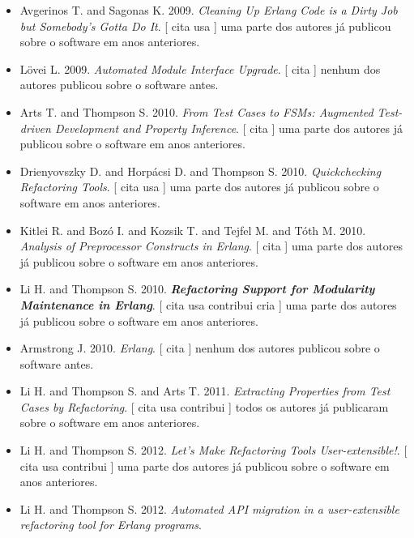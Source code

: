\begin{itemize}
\item Avgerinos T. and Sagonas K.
      2009.
        \textit{ Cleaning Up Erlang Code is a Dirty Job but Somebody's Gotta Do It}.
      [
          cita
          usa
      ]
uma parte dos autores já publicou sobre o software em anos anteriores.
\item L\"{o}vei L.
      2009.
        \textit{ Automated Module Interface Upgrade}.
      [
          cita
      ]
nenhum dos autores publicou sobre o software antes.
\item Arts T. and Thompson S.
      2010.
        \textit{ From Test Cases to FSMs: Augmented Test-driven Development and Property Inference}.
      [
          cita
      ]
uma parte dos autores já publicou sobre o software em anos anteriores.
\item Drienyovszky D. and Horp\'{a}csi D. and Thompson S.
      2010.
        \textit{ Quickchecking Refactoring Tools}.
      [
          cita
          usa
      ]
uma parte dos autores já publicou sobre o software em anos anteriores.
\item Kitlei R. and Boz\'{o} I. and Kozsik T. and Tejfel M. and T\'{o}th M.
      2010.
        \textit{ Analysis of Preprocessor Constructs in Erlang}.
      [
          cita
      ]
uma parte dos autores já publicou sobre o software em anos anteriores.
\item Li H. and Thompson S.
      2010.
        \textbf{\textit{ Refactoring Support for Modularity Maintenance in Erlang}}.
      [
          cita
          usa
          contribui
          cria
      ]
uma parte dos autores já publicou sobre o software em anos anteriores.
\item Armstrong J.
      2010.
        \textit{ Erlang}.
      [
          cita
      ]
nenhum dos autores publicou sobre o software antes.
\item Li H. and Thompson S. and Arts T.
      2011.
        \textit{ Extracting Properties from Test Cases by Refactoring}.
      [
          cita
          usa
          contribui
      ]
todos os autores já publicaram sobre o software em anos anteriores.
\item Li H. and Thompson S.
      2012.
        \textit{ Let's Make Refactoring Tools User-extensible!}.
      [
          cita
          usa
          contribui
      ]
uma parte dos autores já publicou sobre o software em anos anteriores.
\item Li H. and Thompson S.
      2012.
        \textit{ Automated API migration in a user-extensible refactoring tool for Erlang programs}.

\end{itemize}
